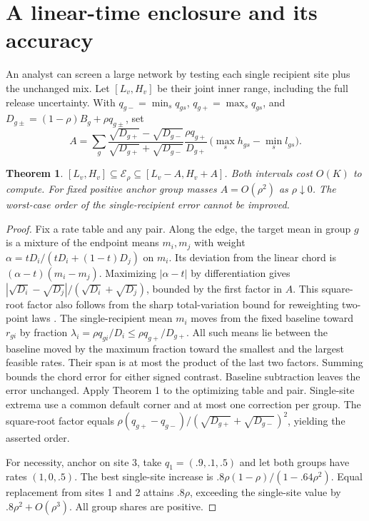 \documentclass[11pt]{article}
\newtheorem{theorem}{Theorem}
\newcommand{\E}{\mathcal{E}}
\begin{document}
\section{A linear-time enclosure and its accuracy}
An analyst can screen a large network by testing each single recipient site plus the unchanged mix. Let $[L_v,H_v]$ be their joint inner range, including the full release uncertainty. With $q_{g-}=\min_s q_{gs}$, $q_{g+}=\max_s q_{gs}$, and $D_{g\pm}=(1-\rho)B_g+\rho q_{g\pm}$, set
\[
 A=\sum_g
 \frac{\sqrt{D_{g+}}-\sqrt{D_{g-}}}{\sqrt{D_{g+}}+\sqrt{D_{g-}}}
 \frac{\rho q_{g+}}{D_{g+}}\,
 \big(\max_s h_{gs}-\min_s l_{gs}\big).
\]
\begin{theorem}
$[L_v,H_v]\subseteq\E_\rho\subseteq[L_v-A,H_v+A]$. Both intervals cost $O(K)$ to compute. For fixed positive anchor group masses $A=O(\rho^2)$ as $\rho\downarrow0$. The worst-case order of the single-recipient error cannot be improved.
\end{theorem}
\begin{proof}
Fix a rate table and any pair. Along the edge, the target mean in group $g$ is a mixture of the endpoint means $m_i,m_j$ with weight $\alpha=tD_i/(tD_i+(1-t)D_j)$ on $m_i$. Its deviation from the linear chord is $(\alpha-t)(m_i-m_j)$. Maximizing $|\alpha-t|$ by differentiation gives $|\sqrt{D_i}-\sqrt{D_j}|/(\sqrt{D_i}+\sqrt{D_j})$, bounded by the first factor in $A$. This square-root factor also follows from the sharp total-variation bound for reweighting two-point laws \cite{cohen}. The single-recipient mean $m_i$ moves from the fixed baseline toward $r_{gi}$ by fraction $\lambda_i=\rho q_{gi}/D_i\le\rho q_{g+}/D_{g+}$. All such means lie between the baseline moved by the maximum fraction toward the smallest and the largest feasible rates. Their span is at most the product of the last two factors. Summing bounds the chord error for either signed contrast. Baseline subtraction leaves the error unchanged. Apply Theorem 1 to the optimizing table and pair. Single-site extrema use a common default corner and at most one correction per group. The square-root factor equals $\rho(q_{g+}-q_{g-})/(\sqrt{D_{g+}}+\sqrt{D_{g-}})^2$, yielding the asserted order.

For necessity, anchor on site 3, take $q_1=(.9,.1,.5)$ and let both groups have rates $(1,0,.5)$. The best single-site increase is $.8\rho(1-\rho)/(1-.64\rho^2)$. Equal replacement from sites 1 and 2 attains $.8\rho$, exceeding the single-site value by $.8\rho^2+O(\rho^3)$. All group shares are positive.
\end{proof}
\end{document}
